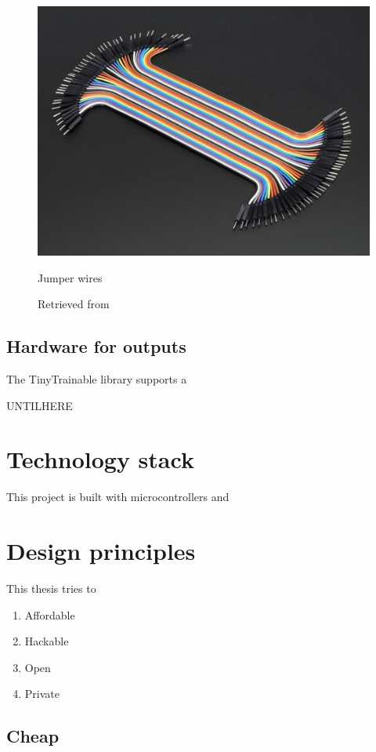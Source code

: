 \begin{figure}[ht]
  \centering
  \includegraphics[width=0.75\linewidth,height=0.25\textheight,keepaspectratio]{images/materials-adafruit-jumper-wires.jpg}
  \caption{Jumper wires}
  \caption*{Retrieved from \cite{website-materials-adafruit-jumper-wires}}
  \label{fig:materials-adafruit-jumper-wires}
\end{figure}

\subsection{Hardware for outputs}

The TinyTrainable library supports a 

UNTILHERE

\section{Technology stack}

This project is built with microcontrollers and 

\section{Design principles}

This thesis tries to 

\begin{enumerate}
  \item Affordable
  \item Hackable
  \item Open
  \item Private
\end{enumerate}

\subsection{Cheap}

